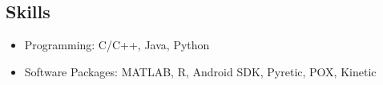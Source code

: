 \documentclass[11pt]{res}
\begin{document}
\begin{resume}
\section{{Skills}}
\begin{itemize} \itemsep -2pt
\item Programming: C/C++, Java, Python
\item Software Packages: MATLAB, R, Android SDK, Pyretic, POX, Kinetic
\end{itemize}
\end{resume}
\end{document}
